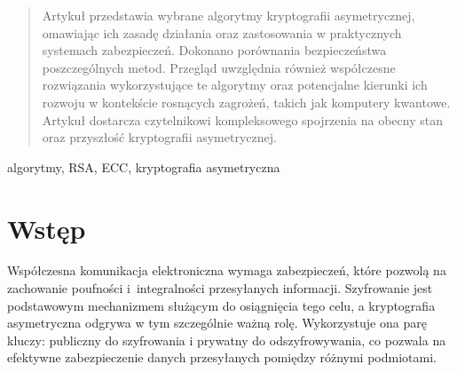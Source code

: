 \documentclass[conference]{IEEEtran}
\begin{document}
\begin{abstract}

Artykuł przedstawia wybrane algorytmy kryptografii asymetrycznej, omawiając ich zasadę działania oraz zastosowania w praktycznych systemach zabezpieczeń. Dokonano porównania bezpieczeństwa poszczególnych metod. Przegląd uwzględnia również współczesne rozwiązania wykorzystujące te algorytmy oraz potencjalne kierunki ich rozwoju w kontekście rosnących zagrożeń, takich jak komputery kwantowe. Artykuł dostarcza czytelnikowi kompleksowego spojrzenia na obecny stan oraz przyszłość kryptografii asymetrycznej.

\end{abstract}

\begin{IEEEkeywords}
algorytmy, RSA, ECC, kryptografia asymetryczna
\end{IEEEkeywords}

\section{Wstęp}


Współczesna komunikacja elektroniczna wymaga zabezpieczeń, które pozwolą na zachowanie poufności i~integralności przesyłanych informacji. Szyfrowanie jest podstawowym mechanizmem służącym do osiągnięcia tego celu, a kryptografia asymetryczna odgrywa w tym szczególnie ważną rolę. Wykorzystuje ona parę kluczy: publiczny do szyfrowania i prywatny do odszyfrowywania, co pozwala na efektywne zabezpieczenie danych przesyłanych pomiędzy różnymi podmiotami.
\end{document}
